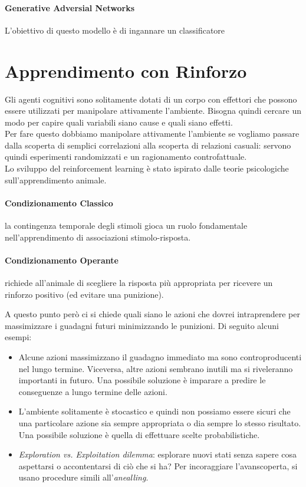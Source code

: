 \documentclass[12pt, a4paper]{article}
\begin{document}
\paragraph{Generative Adversial Networks}
L'obiettivo di questo modello è di ingannare un classificatore

\newpage
\section{Apprendimento con Rinforzo}
Gli agenti cognitivi sono solitamente dotati di un corpo con effettori che possono essere utilizzati per manipolare attivamente l'ambiente. Bisogna quindi cercare un modo per capire quali variabili siano cause e quali siano effetti.\\
Per fare questo dobbiamo manipolare attivamente l'ambiente se vogliamo passare dalla scoperta di semplici correlazioni alla scoperta di relazioni casuali: servono quindi esperimenti randomizzati e un ragionamento controfattuale.\\
Lo sviluppo del reinforcement learning è stato ispirato dalle teorie psicologiche sull'apprendimento animale.
\paragraph{Condizionamento Classico} la contingenza temporale degli stimoli gioca un ruolo fondamentale nell'apprendimento di associazioni stimolo-risposta.
\paragraph{Condizionamento Operante} richiede all'animale di scegliere la risposta più appropriata per ricevere un rinforzo positivo (ed evitare una punizione).

A questo punto però ci si chiede quali siano le azioni che dovrei intraprendere per massimizzare i guadagni futuri minimizzando le punizioni. Di seguito alcuni esempi:
\begin{itemize}
    \item Alcune azioni massimizzano il guadagno immediato ma sono controproducenti nel lungo termine. Viceversa, altre azioni sembrano inutili ma si riveleranno importanti in futuro. Una possibile soluzione è imparare a predire le conseguenze a lungo termine delle azioni.
    \item L'ambiente solitamente è stocastico e quindi non possiamo essere sicuri che una particolare azione sia sempre appropriata o dia sempre lo stesso risultato. Una possibile soluzione è quella di effettuare scelte probabilistiche.
    \item \textit{Exploration vs. Exploitation dilemma}: esplorare nuovi stati senza sapere cosa aspettarsi o accontentarsi di ciò che si ha? Per incoraggiare l'avanscoperta, si usano procedure simili all'\textit{anealling}.
\end{itemize}
\end{document}
